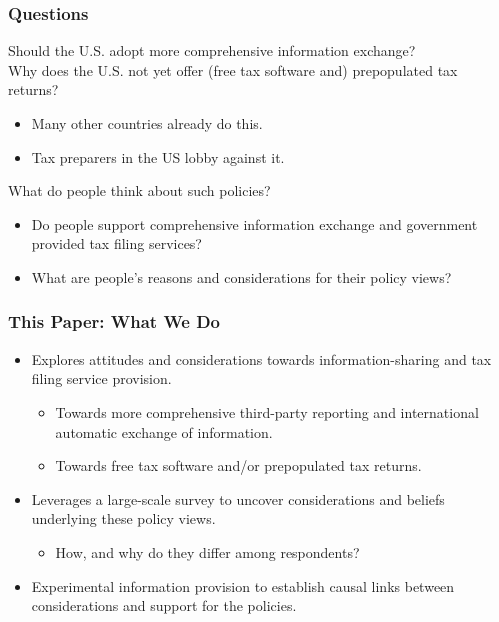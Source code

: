\documentclass{beamer}
\begin{document}
\begin{frame}
\frametitle{Questions}
Should the U.S. adopt more comprehensive information exchange? 
\\
\vspace{1em}
Why does the U.S. not yet offer (free tax software and) prepopulated tax returns?
\begin{itemize}
    \item Many other countries already do this.\\[0.2em]
    \item Tax preparers in the US lobby against it.
\end{itemize}
\vspace{1em}
What do people think about such policies?
\begin{itemize}
    \item Do people support comprehensive information exchange and government provided tax filing services?  \\[0.2em]
    \item What are people's reasons and considerations for their policy views?
\end{itemize}
\end{frame}

\begin{frame}
\frametitle{This Paper: What We Do}
\begin{itemize}
    \item Explores \alert{attitudes} and considerations \alert{towards information-sharing and tax filing service provision}.
    \begin{itemize}
        \item Towards more comprehensive third-party reporting and international automatic exchange of information. \\[0.2em]
        \item Towards free tax software and/or prepopulated tax returns.
    \end{itemize}
    \vspace{1em} 
    \item Leverages a \alert{large-scale survey to uncover considerations and beliefs} underlying these policy views.
    \begin{itemize}
        \item How, and why do they differ among respondents?
    \end{itemize}
    \vspace{1em} 
    \item \alert{Experimental information} provision to establish \alert{causal} links between considerations and support for the policies.
\end{itemize}
\end{frame}
\end{document}
